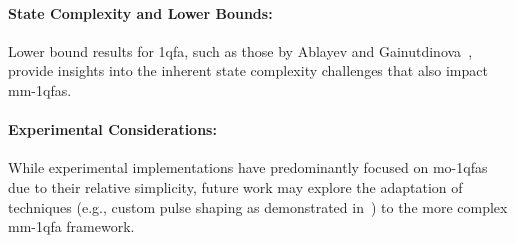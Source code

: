 \paragraph{State Complexity and Lower Bounds:} Lower bound results for \gls{1qfa}, such as those by Ablayev and Gainutdinova~\cite{10.1007/3-540-44612-5_9}, provide insights into the inherent state complexity challenges that also impact \gls{mm-1qfa}s.

\paragraph{Experimental Considerations:} While experimental implementations have predominantly focused on \gls{mo-1qfa}s due to their relative simplicity, future work may explore the adaptation of techniques (e.g., custom pulse shaping as demonstrated in~\cite{lussi2024implementingquantumfiniteautomaton}) to the more complex \gls{mm-1qfa} framework.


